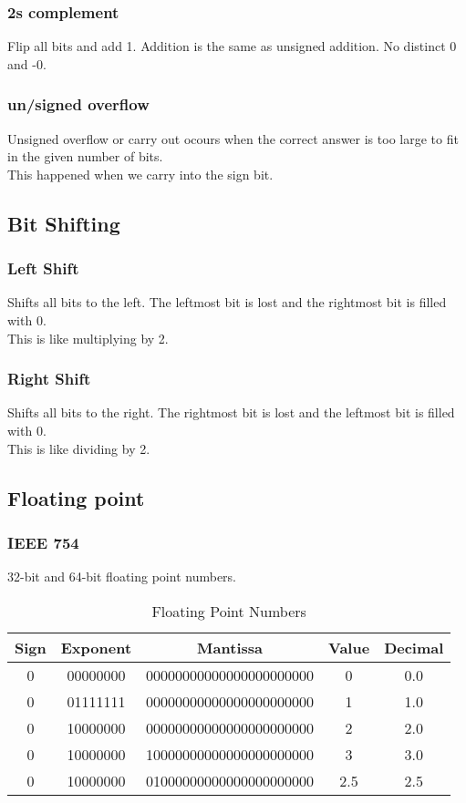 \documentclass[answers,12pt,addpoints]{exam}
\begin{document}
\subsubsection{2s complement} 
Flip all bits and add 1. Addition is the same as unsigned addition. No distinct 0 and -0.
\subsubsection{un/signed overflow}
Unsigned overflow or carry out ocours when the correct answer is too large to fit in the given number of bits. \\
This happened when we carry into the sign bit. \\

\subsection{Bit Shifting}
\subsubsection{Left Shift}
Shifts all bits to the left. The leftmost bit is lost and the rightmost bit is filled with 0. \\
This is like multiplying by 2. \\
\subsubsection{Right Shift}
Shifts all bits to the right. The rightmost bit is lost and the leftmost bit is filled with 0. \\
This is like dividing by 2. \\

\subsection{Floating point}
\subsubsection{IEEE 754}
32-bit and 64-bit floating point numbers. \\
\begin{table}[h!]
\centering
\begin{tabular}{|c|c|c|c|c|}
\hline
Sign & Exponent & Mantissa & Value & Decimal \\ \hline
0 & 00000000 & 00000000000000000000000 & 0 & 0.0 \\ \hline
0 & 01111111 & 00000000000000000000000 & 1 & 1.0 \\ \hline
0 & 10000000 & 00000000000000000000000 & 2 & 2.0 \\ \hline
0 & 10000000 & 10000000000000000000000 & 3 & 3.0 \\ \hline
0 & 10000000 & 01000000000000000000000 & 2.5 & 2.5 \\ \hline
\end{tabular}
\caption{Floating Point Numbers}
\label{tab:floating-point}
\end{table}
\end{document}
